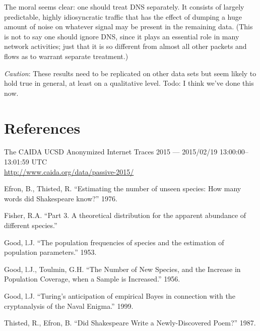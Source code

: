 \documentclass{paper}
\begin{document}
The moral seems clear: one should treat DNS separately. It consists of largely
predictable, highly idiosyncratic traffic that has the effect of dumping a huge
amount of noise on whatever signal may be present in the remaining data. (This
is not to say one should ignore DNS, since it plays an essential role in many
network activities; just that it is so different from almost all other packets
and flows as to warrant separate treatment.)

\emph{Caution}: These results need to be replicated on other data sets but seem
likely to hold true in general, at least on a qualitative level. Todo: I think
we've done this now.

\section{References}
The CAIDA UCSD Anonymized Internet Traces 2015 --- 2015/02/19 13:00:00--13:01:59 UTC \\
\url{http://www.caida.org/data/passive-2015/}

Efron, B., Thisted, R. ``Estimating the number of unseen species: How many words
did Shakespeare know?'' 1976.

Fisher, R.A. ``Part 3. A theoretical distribution for the apparent abundance of
different species.''

Good, l.J. ``The population frequencies of species and the estimation of
population parameters.'' 1953.

Good, l.J., Toulmin, G.H. ``The Number of New Species, and the Increase in
Population Coverage, when a Sample is Increased.'' 1956.

Good, l.J. ``Turing's anticipation of empirical Bayes in connection with the
cryptanalysis of the Naval Enigma.'' 1999.

Thisted, R., Efron, B. ``Did Shakespeare Write a Newly-Discovered Poem?'' 1987.
\end{document}
